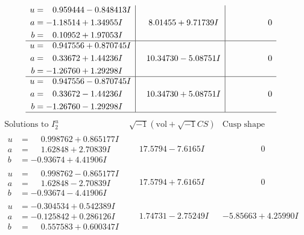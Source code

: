 \documentclass[1p]{elsarticle_modified}
\theoremstyle{definition}
\newcommand{\I}{\sqrt{-1}}
\begin{document}
$$\begin{array}{c|c|c}
\begin{aligned}
u &= \phantom{-}0.959444 - 0.848413 I \\
a &= -1.18514 + 1.34955 I \\
b &= \phantom{-}0.10952 + 1.97053 I\end{aligned}
 & \phantom{-}8.01455 + 9.71739 I & \phantom{-0.000000 } 0 \\ \hline\begin{aligned}
u &= \phantom{-}0.947556 + 0.870745 I \\
a &= \phantom{-}0.33672 + 1.44236 I \\
b &= -1.26760 + 1.29298 I\end{aligned}
 & \phantom{-}10.34730 - 5.08751 I & \phantom{-0.000000 } 0 \\ \hline\begin{aligned}
u &= \phantom{-}0.947556 - 0.870745 I \\
a &= \phantom{-}0.33672 - 1.44236 I \\
b &= -1.26760 - 1.29298 I\end{aligned}
 & \phantom{-}10.34730 + 5.08751 I & \phantom{-0.000000 } 0\\
 \hline 
 \end{array}$$\newpage$$\begin{array}{c|c|c}  
\text{Solutions to }I^u_{2}& \I (\text{vol} + \sqrt{-1}CS) & \text{Cusp shape}\\
 \hline 
\begin{aligned}
u &= \phantom{-}0.998762 + 0.865177 I \\
a &= \phantom{-}1.62848 + 2.70839 I \\
b &= -0.93674 + 4.41906 I\end{aligned}
 & \phantom{-}17.5794 - 7.6165 I & \phantom{-0.000000 } 0 \\ \hline\begin{aligned}
u &= \phantom{-}0.998762 - 0.865177 I \\
a &= \phantom{-}1.62848 - 2.70839 I \\
b &= -0.93674 - 4.41906 I\end{aligned}
 & \phantom{-}17.5794 + 7.6165 I & \phantom{-0.000000 } 0 \\ \hline\begin{aligned}
u &= -0.304534 + 0.542389 I \\
a &= -0.125842 + 0.286126 I \\
b &= \phantom{-}0.557583 + 0.600347 I\end{aligned}
 & \phantom{-}1.74731 - 2.75249 I & -5.85663 + 4.25990 I \\ \hline\begin{aligned}

\end{aligned}
\end{array}$$
\end{document}
